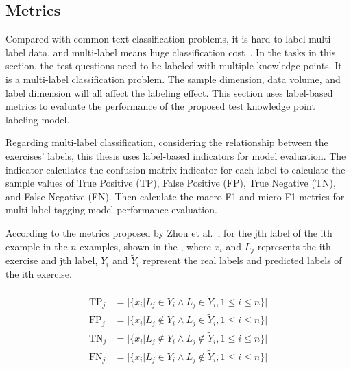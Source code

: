 \subsection{Metrics}
Compared with common text classification problems, it is hard to label multi-label data, and multi-label means huge classification cost~\cite{zhang2013review}. In the tasks in this section, the test questions need to be labeled with multiple knowledge points. It is a multi-label classification problem. The sample dimension, data volume, and label dimension will all affect the labeling effect. This section uses label-based metrics to evaluate the performance of the proposed test knowledge point labeling model.


Regarding multi-label classification, considering the relationship between the exercises' labels, this thesis uses label-based indicators for model evaluation. The indicator calculates the confusion matrix indicator for each label to calculate the sample values of True Positive (TP), False Positive (FP), True Negative (TN), and False Negative (FN). Then calculate the macro-F1 and micro-F1 metrics for multi-label tagging model performance evaluation.

According to the metrics proposed by Zhou et al.~\cite{zhang2013review}, for the jth label of the ith example in the \(n\) examples, shown in the \eqname{\ref{fml:mlcm}}, where \(x_i\) and \(L_j\) represents the ith exercise and jth label, \(Y_i\) and \(\tilde{Y}_i\) represent the real labels and predicted labels of the ith exercise.

\begin{align}\label{fml:mlcm}
    \begin{split}
        \operatorname{TP}_j & =| \{x_i| L_j\in Y_{i}\wedge L_j \in \tilde{Y}_i , 1\leq i \leq n\}|       \\
        \operatorname{FP}_j & =| \{x_i| L_j\notin Y_{i}\wedge L_j \in \tilde{Y}_i , 1\leq i \leq n\}|    \\
        \operatorname{TN}_j & =| \{x_i| L_j\notin Y_{i}\wedge L_j \notin \tilde{Y}_i , 1\leq i \leq n\}| \\
        \operatorname{FN}_j & =| \{x_i| L_j\in Y_{i}\wedge L_j \notin \tilde{Y}_i , 1\leq i \leq n\}|
    \end{split}
\end{align}


